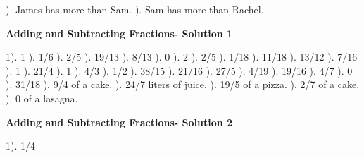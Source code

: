 \documentclass{article}%
\begin{document}
). James has more than Sam.%
). Sam has more than Rachel.%
\newline%
\newpage%
\large%
\begin{center}%
\textbf{Adding and Subtracting Fractions- Solution 1}%
\newline%
\end{center} \normalsize%
1). 1%
). 1/6%
). 2/5%
). 19/13%
). 8/13%
). 0%
). 2%
). 2/5%
). 1/18%
). 11/18%
). 13/12%
). 7/16%
). 1%
). 21/4%
). 1%
). 4/3%
). 1/2%
). 38/15%
). 21/16%
). 27/5%
). 4/19%
). 19/16%
). 4/7%
). 0%
). 31/18%
). 9/4 of a cake.%
). 24/7 liters of juice.%
). 19/5 of a pizza.%
). 2/7 of a cake.%
). 0 of a lasagna.%
\newline%
\newpage%
\large%
\begin{center}%
\textbf{Adding and Subtracting Fractions- Solution 2}%
\newline%
\end{center} \normalsize%
1). 1/4%
\newline%
\end{document}
